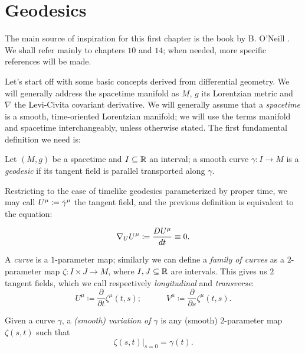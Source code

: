 \section{Geodesics}\label{sec:geodesics}

The main source of inspiration for this first chapter is the book by B. O'Neill \cite{o1983semi}. We shall refer mainly to chapters \(10\) and \(14\); when needed, more specific references will be made.

Let's start off with some basic concepts derived from differential geometry. We will generally address the spacetime manifold as \(M\), \(g\) its Lorentzian metric and \(\nabla\) the Levi-Civita covariant derivative.
We will generally assume that a \emph{spacetime} is a smooth, time-oriented Lorentzian manifold; we will use the terms manifold and spacetime interchangeably, unless otherwise stated.
The first fundamental definition we need is:
\begin{definition}
	Let \((M, g)\) be a spacetime and \(I \subseteq {\mathbb{R}}\) an interval; a smooth curve \(\gamma : I \rightarrow M\) is a \emph{geodesic} if its tangent field is parallel transported along \(\gamma\).\\
\end{definition}    


Restricting to the case of timelike geodesics parameterized by proper time, we may call \(U\indices{^{\mu}} \coloneqq \dot{\gamma}^{\mu}\) the tangent field, and the previous definition is equivalent to the equation:

\begin{equation}
\label{eq:tang-trans-fields}
\nabla_U U^{\mu} \coloneqq \frac{D\tensor{U}{^\mu} }{dt} \equiv 0.
\end{equation}



A \emph{curve} is a \(1\)-parameter map; similarly we can define a \emph{family of curves} as a \(2\)-parameter map \(\zeta: I \times J \rightarrow M\), where \(I, J \subseteq {\mathbb{R}}\) are intervals. This gives us \(2\) tangent fields, which we call respectively \emph{longitudinal} and \emph{transverse}:
\[
U^{\mu} \coloneqq \frac{\partial}{\partial t} \zeta^{\mu}(t,s); \quad \quad \quad 
V^{\mu} \coloneqq \frac{\partial}{\partial s} \zeta^{\mu}(t,s). 
\]

\begin{definition}
	Given a curve \(\gamma\), a \emph{(smooth) variation of \(\gamma\)} is any (smooth) \(2\)-parameter map \(\zeta(s,t)\) such that 
	\[
	\left. \zeta(s, t) \right\vert_{s = 0} = \gamma(t).
	\]
\end{definition}

